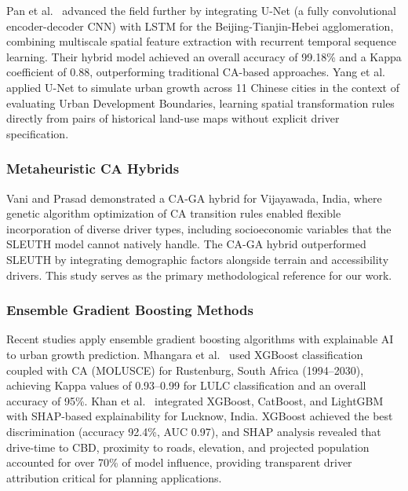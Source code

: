 \documentclass[conference]{IEEEtran}
\begin{document}
Pan et al.\ \cite{pan2022} advanced the field further by integrating U-Net (a fully convolutional encoder-decoder CNN) with LSTM for the Beijing-Tianjin-Hebei agglomeration, combining multiscale spatial feature extraction with recurrent temporal sequence learning. Their hybrid model achieved an overall accuracy of 99.18\% and a Kappa coefficient of 0.88, outperforming traditional CA-based approaches. Yang et al.\ \cite{yang2025} applied U-Net to simulate urban growth across 11 Chinese cities in the context of evaluating Urban Development Boundaries, learning spatial transformation rules directly from pairs of historical land-use maps without explicit driver specification.

\subsubsection{Metaheuristic CA Hybrids}
Vani and Prasad \cite{vani2022} demonstrated a CA-GA hybrid for Vijayawada, India, where genetic algorithm optimization of CA transition rules enabled flexible incorporation of diverse driver types, including socioeconomic variables that the SLEUTH model cannot natively handle. The CA-GA hybrid outperformed SLEUTH by integrating demographic factors alongside terrain and accessibility drivers. This study serves as the primary methodological reference for our work.

\subsubsection{Ensemble Gradient Boosting Methods}
Recent studies apply ensemble gradient boosting algorithms with explainable AI to urban growth prediction. Mhangara et al.\ \cite{mhangara2025} used XGBoost classification coupled with CA (MOLUSCE) for Rustenburg, South Africa (1994--2030), achieving Kappa values of 0.93--0.99 for LULC classification and an overall accuracy of 95\%. Khan et al.\ \cite{khan2025} integrated XGBoost, CatBoost, and LightGBM with SHAP-based explainability for Lucknow, India. XGBoost achieved the best discrimination (accuracy 92.4\%, AUC 0.97), and SHAP analysis revealed that drive-time to CBD, proximity to roads, elevation, and projected population accounted for over 70\% of model influence, providing transparent driver attribution critical for planning applications.
\end{document}
